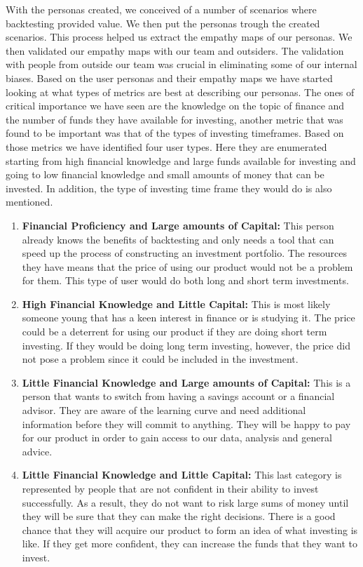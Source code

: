 \documentclass[main.tex]{subfiles}
\begin{document}
With the personas created, we conceived of a number of scenarios where backtesting provided value. We then put the personas trough the created scenarios. This process helped us extract the  empathy maps \cite{empathy_maps} of our personas. We then validated our empathy maps with our team and outsiders. The validation with people from outside our team was crucial in eliminating some of our internal biases.
Based on the user personas and their empathy maps we have started looking at what types of metrics are best at describing our personas. The ones of critical importance we have seen are the knowledge on the topic of finance and the number of funds they have available for investing, another metric that was found to be important was that of the types of investing timeframes. Based on those metrics we have identified four user types. Here they are enumerated starting from high financial knowledge and large funds available for investing and going to low financial knowledge and small amounts of money that can be invested. In addition, the type of investing time frame they would do is also mentioned.

\begin{enumerate}
    \item \textbf{Financial Proficiency and Large amounts of Capital:  }This person already knows the benefits of backtesting and only needs a tool that can speed up the process of constructing an investment portfolio. The resources they have means that the price of using our product would not be a problem for them. This type of user would do both long and short term investments.
    \item \textbf{High Financial Knowledge and Little Capital:  } This is most likely someone young that has a keen interest in finance or is studying it. The price could be a deterrent for using our product if they are doing short term investing. If they would be doing long term investing, however, the price did not pose a problem since it could be included in the investment.
    \item \textbf{Little Financial Knowledge and Large amounts of Capital:  }This is a person that wants to switch from having a savings account or a financial advisor. They are aware of the learning curve and need additional information before they will commit to anything. They will be happy to pay for our product in order to gain access to our data, analysis and general advice.
    \item \textbf{Little Financial Knowledge and Little Capital:  }This  last category is represented by people that are not confident in their ability to invest successfully. As a result, they do not want to risk large sums of money until they will be sure that they can make the right decisions. There is a good chance that they will acquire our product to form an idea of what investing is like. If they get more confident, they can increase the funds that they want to invest.
\end{enumerate}
\end{document}
